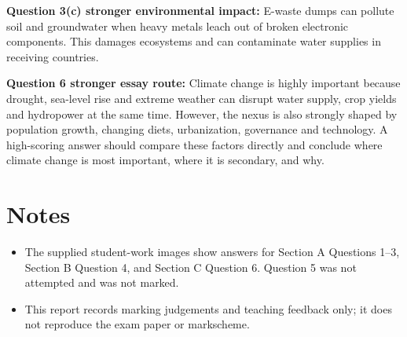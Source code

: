 \documentclass[11pt]{article}
\begin{document}
\textbf{Question 3(c) stronger environmental impact:}
E-waste dumps can pollute soil and groundwater when heavy metals leach out of broken electronic components. This damages ecosystems and can contaminate water supplies in receiving countries.

\textbf{Question 6 stronger essay route:}
Climate change is highly important because drought, sea-level rise and extreme weather can disrupt water supply, crop yields and hydropower at the same time. However, the nexus is also strongly shaped by population growth, changing diets, urbanization, governance and technology. A high-scoring answer should compare these factors directly and conclude where climate change is most important, where it is secondary, and why.

\section*{Notes}

\begin{itemize}
  \item The supplied student-work images show answers for Section A Questions 1--3, Section B Question 4, and Section C Question 6. Question 5 was not attempted and was not marked.
  \item This report records marking judgements and teaching feedback only; it does not reproduce the exam paper or markscheme.
\end{itemize}
\end{document}
